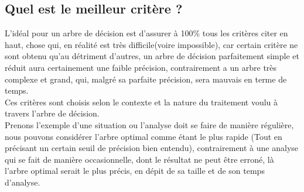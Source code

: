 \documentclass[a4paper, 11pt]{report}
\begin{document}
\subsection{Quel est le meilleur critère ?}
L'idéal pour un arbre de décision est d'assurer à 100\% tous les critères citer en haut, chose qui, en réalité est très difficile(voire impossible), car certain critère ne sont obtenu qu'au détriment d'autres, un arbre de décision parfaitement simple et réduit aura certainement une faible précision, contrairement a un arbre très complexe et grand, qui, malgré sa parfaite précision, sera mauvais en terme de temps.\\
Ces critères sont choisis selon le contexte et la nature du traitement voulu à travers l'arbre de décision.
\\Prenons l'exemple d'une situation ou l'analyse doit se faire de manière régulière, nous pouvons considérer l'arbre optimal comme étant le plus rapide (Tout en précisant un certain seuil de précision bien entendu), contrairement à une analyse qui se fait de manière occasionnelle, dont le résultat ne peut être erroné, là l'arbre optimal serait le plus précis, en dépit de sa taille et de son temps d'analyse. 
\end{document}
